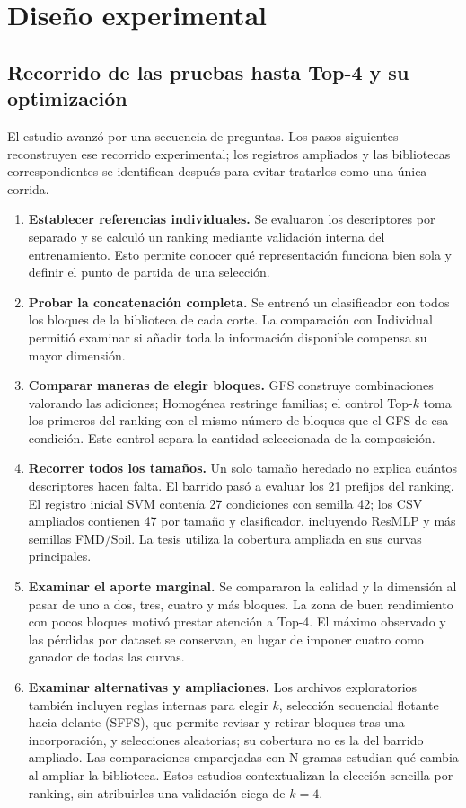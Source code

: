 \chapter{Diseño experimental}\label{sec:diseno}

\section{Recorrido de las pruebas hasta Top-4 y su optimización}
El estudio avanzó por una secuencia de preguntas. Los pasos siguientes reconstruyen ese recorrido experimental; los registros ampliados y las bibliotecas correspondientes se identifican después para evitar tratarlos como una única corrida.
\begin{enumerate}
\item \textbf{Establecer referencias individuales.} Se evaluaron los descriptores por separado y se calculó un ranking mediante validación interna del entrenamiento. Esto permite conocer qué representación funciona bien sola y definir el punto de partida de una selección.
\item \textbf{Probar la concatenación completa.} Se entrenó un clasificador con todos los bloques de la biblioteca de cada corte. La comparación con Individual permitió examinar si añadir toda la información disponible compensa su mayor dimensión.
\item \textbf{Comparar maneras de elegir bloques.} GFS construye combinaciones valorando las adiciones; Homogénea restringe familias; el control Top-\(k\) toma los primeros del ranking con el mismo número de bloques que el GFS de esa condición. Este control separa la cantidad seleccionada de la composición.
\item \textbf{Recorrer todos los tamaños.} Un solo tamaño heredado no explica cuántos descriptores hacen falta. El barrido pasó a evaluar los 21 prefijos del ranking. El registro inicial SVM contenía 27 condiciones con semilla 42; los CSV ampliados contienen 47 por tamaño y clasificador, incluyendo ResMLP y más semillas FMD/Soil. La tesis utiliza la cobertura ampliada en sus curvas principales.
\item \textbf{Examinar el aporte marginal.} Se compararon la calidad y la dimensión al pasar de uno a dos, tres, cuatro y más bloques. La zona de buen rendimiento con pocos bloques motivó prestar atención a Top-4. El máximo observado y las pérdidas por dataset se conservan, en lugar de imponer cuatro como ganador de todas las curvas.
\item \textbf{Examinar alternativas y ampliaciones.} Los archivos exploratorios también incluyen reglas internas para elegir \(k\), selección secuencial flotante hacia delante (SFFS), que permite revisar y retirar bloques tras una incorporación, y selecciones aleatorias; su cobertura no es la del barrido ampliado. Las comparaciones emparejadas con N-gramas estudian qué cambia al ampliar la biblioteca. Estos estudios contextualizan la elección sencilla por ranking, sin atribuirles una validación ciega de \(k=4\).

\end{enumerate}
